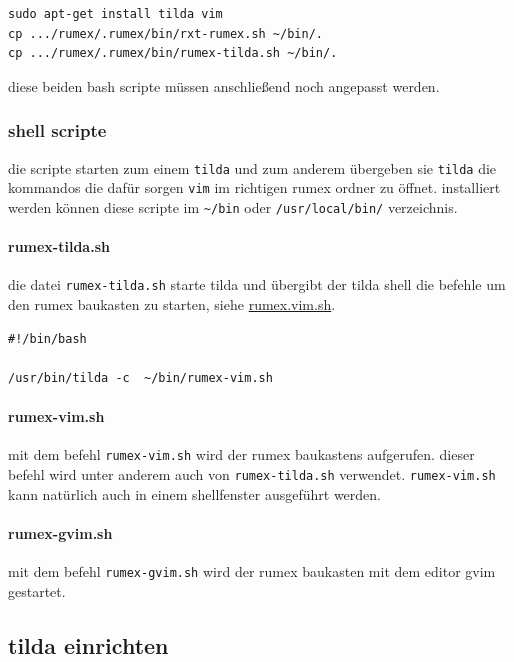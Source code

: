 \begin{verbatim}
sudo apt-get install tilda vim
cp .../rumex/.rumex/bin/rxt-rumex.sh ~/bin/.
cp .../rumex/.rumex/bin/rumex-tilda.sh ~/bin/.
\end{verbatim}

diese beiden bash scripte müssen anschließend noch angepasst werden.

\subsubsection{shell scripte}\label{shell-scripte}

die scripte starten zum einem \texttt{tilda} und zum anderem übergeben
sie \texttt{tilda} die kommandos die dafür sorgen \texttt{vim} im
richtigen rumex ordner zu öffnet. installiert werden können diese
scripte im \texttt{\textasciitilde{}/bin} oder \texttt{/usr/local/bin/}
verzeichnis.

\paragraph{rumex-tilda.sh}\label{rumex-tilda.sh}

die datei \texttt{rumex-tilda.sh} starte tilda und übergibt der tilda
shell die befehle um den rumex baukasten zu starten, siehe
\hyperref[rumex.vim.sh]{rumex.vim.sh}.

\begin{verbatim}
#!/bin/bash

/usr/bin/tilda -c  ~/bin/rumex-vim.sh
\end{verbatim}

\paragraph{rumex-vim.sh}\label{rumex-vim.sh}

mit dem befehl \texttt{rumex-vim.sh} wird der rumex baukastens
aufgerufen. dieser befehl wird unter anderem auch von
\texttt{rumex-tilda.sh} verwendet. \texttt{rumex-vim.sh} kann natürlich
auch in einem shellfenster ausgeführt werden.

\paragraph{rumex-gvim.sh}\label{rumex-gvim.sh}

mit dem befehl \texttt{rumex-gvim.sh} wird der rumex baukasten mit dem
editor gvim gestartet.

\subsection{tilda einrichten}\label{tilda-einrichten}

